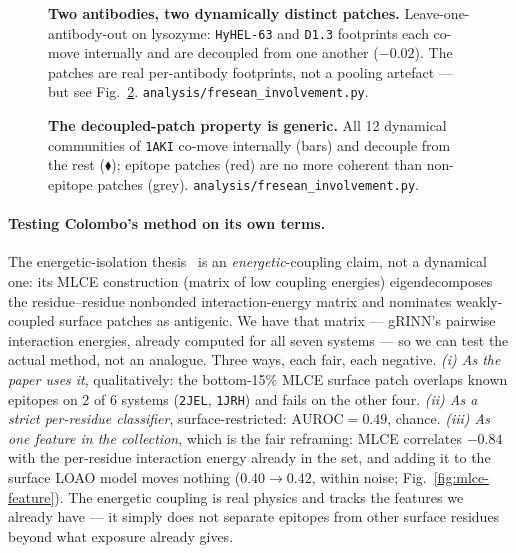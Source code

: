 \begin{figure}[H]\centering
{}
\caption{\textbf{Two antibodies, two dynamically distinct patches.} Leave-one-antibody-out on lysozyme:
\texttt{HyHEL-63} and \texttt{D1.3} footprints each co-move internally and are decoupled from one another
($-0.02$). The patches are real per-antibody footprints, not a pooling artefact --- but see
Fig.~\ref{fig:patch-generality}. \texttt{analysis/fresean\_involvement.py}.}
\label{fig:per-antibody}
\end{figure}

\begin{figure}[H]\centering
{}
\caption{\textbf{The decoupled-patch property is generic.} All 12 dynamical communities of \texttt{1AKI}
co-move internally (bars) and decouple from the rest ($\blacklozenge$); epitope patches (red) are no more
coherent than non-epitope patches (grey). \texttt{analysis/fresean\_involvement.py}.}
\label{fig:patch-generality}
\end{figure}

\paragraph{Testing Colombo's method on its own terms.} The energetic-isolation thesis~\cite{serapian2020}
is an \emph{energetic}-coupling claim, not a dynamical one: its MLCE construction (matrix of low coupling
energies) eigendecomposes the residue--residue nonbonded interaction-energy matrix and nominates
weakly-coupled surface patches as antigenic. We have that matrix --- gRINN's pairwise interaction energies,
already computed for all seven systems --- so we can test the actual method, not an analogue. Three ways,
each fair, each negative. \emph{(i) As the paper uses it}, qualitatively: the bottom-15\% MLCE surface patch
overlaps known epitopes on 2 of 6 systems (\texttt{2JEL}, \texttt{1JRH}) and fails on the other four.
\emph{(ii) As a strict per-residue classifier}, surface-restricted: $\mathrm{AUROC}=0.49$, chance.
\emph{(iii) As one feature in the collection}, which is the fair reframing: MLCE correlates $-0.84$ with the
per-residue interaction energy already in the set, and adding it to the surface LOAO model moves nothing
($0.40\!\to\!0.42$, within noise; Fig.~\ref{fig:mlce-feature}). The energetic coupling is real physics and
tracks the features we already have --- it simply does not separate epitopes from other surface residues
beyond what exposure already gives.

